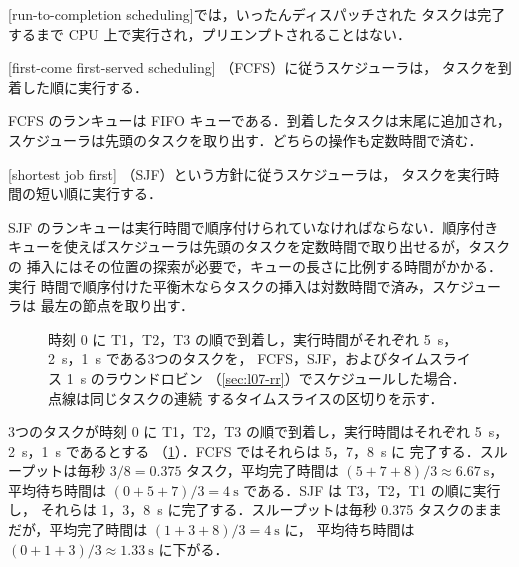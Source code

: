 \documentclass[../main.tex]{subfiles}
\begin{document}
\begin{definition}[実行完了型スケジューリング]
  [run-to-completion scheduling]では，いったんディスパッチされた
  タスクは完了するまで CPU 上で実行され，プリエンプトされることはない．
\end{definition}

\begin{definition}[FCFS]
  [first-come first-served scheduling]%
  （FCFS）に従うスケジューラは，
  タスクを到着した順に実行する．
\end{definition}

FCFS のランキューは FIFO キューである．到着したタスクは末尾に追加され，
スケジューラは先頭のタスクを取り出す．どちらの操作も定数時間で済む．

\begin{definition}[SJF]
  [shortest job first]%
  （SJF）という方針に従うスケジューラは，
  タスクを実行時間の短い順に実行する．
\end{definition}

SJF のランキューは実行時間で順序付けられていなければならない．順序付き
キューを使えばスケジューラは先頭のタスクを定数時間で取り出せるが，タスクの
挿入にはその位置の探索が必要で，キューの長さに比例する時間がかかる．実行
時間で順序付けた平衡木ならタスクの挿入は対数時間で済み，スケジューラは
最左の節点を取り出す．

\begin{figure}[htbp]
  \centering
  
  \caption{時刻 0 に T1，T2，T3 の順で到着し，実行時間がそれぞれ
    \SI{5}{\second}，\SI{2}{\second}，\SI{1}{\second} である3つのタスクを，
    FCFS，SJF，およびタイムスライス \SI{1}{\second} のラウンドロビン
    （\cref{sec:l07-rr}）でスケジュールした場合．点線は同じタスクの連続
    するタイムスライスの区切りを示す．}
  \label{fig:l07-gantt}
\end{figure}

\begin{example}
  \label{ex:l07-rtc}
  3つのタスクが時刻 0 に T1，T2，T3 の順で到着し，実行時間はそれぞれ
  \SI{5}{\second}，\SI{2}{\second}，\SI{1}{\second} であるとする
  （\cref{fig:l07-gantt}）．FCFS ではそれらは 5，7，\SI{8}{\second} に
  完了する．スループットは毎秒 $3/8 = 0.375$ タスク，平均完了時間は
  $(5+7+8)/3 \approx \SI{6.67}{\second}$，平均待ち時間は
  $(0+5+7)/3 = \SI{4}{\second}$ である．SJF は T3，T2，T1 の順に実行し，
  それらは 1，3，\SI{8}{\second} に完了する．スループットは毎秒 0.375
  タスクのままだが，平均完了時間は $(1+3+8)/3 = \SI{4}{\second}$ に，
  平均待ち時間は $(0+1+3)/3 \approx \SI{1.33}{\second}$ に下がる．
\end{example}
\end{document}
